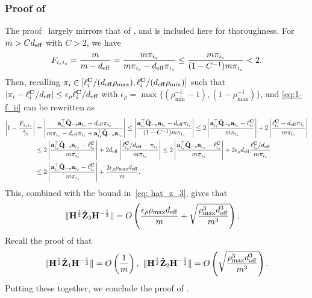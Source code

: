 \documentclass[11pt,a4paper]{article}
\begin{document}
\subsubsection{Proof of } \label{rem:proof_inver_bias_constant_debias}
The proof~ largely mirrors that of , and is included here for thoroughness. 
For $m > C d_{\mathrm{eff}}$ with $C> 2$,  we have
\begin{align}
   F_{i_si_s}=\frac{m}{m-d_{\mathrm{eff}}} =\frac{m\pi_{i_s}}{m\pi_{i_s}-d_{\mathrm{eff}}\pi_{i_s}}\leq \frac{m\pi_{i_s}}{(1-C^{-1})m\pi_{i_s}}<2.  \nonumber
\end{align}
Then, recalling $\pi_i\in [\ell^{\mathbf{C}}_{i}/(d_{\mathrm{eff}} \rho_{\max}), \ell^{\mathbf{C}}_{i}/(d_{\mathrm{eff}}\rho_{\min})]$ such that $|\pi_i- \ell_i^{\mathbf{C}}/d_{\mathrm{eff}}|\leq \epsilon_{\rho}\ell_i^{\mathbf{C}}/d_{\mathrm{eff}}$  with $\epsilon_{\rho}=\max\{(\rho_{\min}^{-1}-1),(1 - \rho_{\max}^{-1})\}$, and \eqref{eq:1-f_ii} can be rewritten as
    \begin{align}
   \left| 1-\frac{F_{i_si_s}}{\check \gamma_s}\right|&=\left | \frac{\mathbf{a}_{i_s}^\top \check{\mathbf{Q}}_{-s}\mathbf{a}_{i_s}-d_{\mathrm{eff}}\pi_{i_s}}{m\pi_{i_s}-d_{\mathrm{eff}}\pi_{i_s}+\mathbf{a}_{i_s}^\top \check{\mathbf{Q}}_{-s}\mathbf{a}_{i_s}}\right|\leq \left| \frac{\mathbf{a}_{i_s}^\top \check{\mathbf{Q}}_{-s}\mathbf{a}_{i_s}-d_{\mathrm{eff}}\pi_{i_s}}{(1-C^{-1})m\pi_{i_s}}\right|\leq  2\left| \frac{\mathbf{a}_{i_s}^\top \check{\mathbf{Q}}_{-s}\mathbf{a}_{i_s}-\ell^{\mathbf{C}}_{i_s}}{m\pi_{i_s}}\right|+ 2\left| \frac{\ell^{\mathbf{C}}_{i_s}-d_{\mathrm{eff}}\pi_{i_s}}{m\pi_{i_s}}\right|\nonumber\\
      &\leq 2\left| \frac{\mathbf{a}_{i_s}^\top \check{\mathbf{Q}}_{-s}\mathbf{a}_{i_s}-\ell^{\mathbf{C}}_{i_s}}{m\pi_{i_s}}\right|+ 2d_{\mathrm{eff}}\left| \frac{\ell^{\mathbf{C}}_{i_s}/d_{\mathrm{eff}}-\pi_{i_s}}{m\pi_{i_s}}\right|\leq 2\left| \frac{\mathbf{a}_{i_s}^\top \check{\mathbf{Q}}_{-s}\mathbf{a}_{i_s}-\ell^{\mathbf{C}}_{i_s}}{m\pi_{i_s}}\right|+2\epsilon_{\rho} d_{\mathrm{eff}} \frac{\ell^{\mathbf{C}}_{i_s}/d_{\mathrm{eff}}}{m\pi_{i_s}}\nonumber\\
      &\leq 2\left| \frac{\mathbf{a}_{i_s}^\top \check{\mathbf{Q}}_{-s}\mathbf{a}_{i_s}-\ell^{\mathbf{C}}_{i_s}}{m\pi_{i_s}}\right|+\frac{2\epsilon_{\rho} \rho_{\max} d_{\mathrm{eff}}}{m}.\nonumber
\end{align}
This, combined with the bound in~\eqref{eq: hat_z_3}, gives that 
\begin{align*}
  \|\mathbf{H}^{\frac{1}{2}}\check{\mathbf{Z}}_3\mathbf{H}^{-\frac{1}{2}}\|
     & = O\left(\frac{\epsilon_{\rho} \rho_{\max} d_{\mathrm{eff}}}{m}+\sqrt{\frac{\rho_{\max}^3 d^3_{\mathrm{eff}}}{m^3}}\right).   
\end{align*}
Recall the proof of  that
\begin{align*}
    \|\mathbf{H}^{\frac{1}{2}}\check{\mathbf{Z}}_1\mathbf{H}^{-\frac{1}{2}}\|= O\left(\frac{ 1}{m}\right),~    \|\mathbf{H}^{\frac{1}{2}}\check{\mathbf{Z}}_2\mathbf{H}^{-\frac{1}{2}}\|= O\left(\sqrt{\frac{\rho_{\max}^3 d^3_{\mathrm{eff}}}{m^3}}\right).
\end{align*}
Putting these together, we conclude the proof of . 
\end{document}
